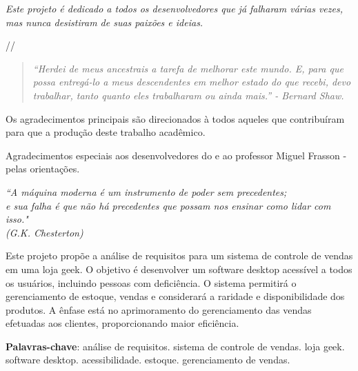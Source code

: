 \documentclass[
	12pt,				%
	openright,			%
	twoside,			%
	a4paper,			%
	english,			%
	brazil				%
	]{abntex2}
\begin{document}
\begin{dedicatoria}
	\vspace*{\fill}
	\centering
	\noindent
	\textit{Este projeto é dedicado a todos os desenvolvedores que já falharam várias vezes, mas nunca desistiram de suas paixões e ideias.}
 
	//
 
	\begin{quote}
	 \textit{``Herdei de meus ancestrais a tarefa de melhorar este mundo. E, para que possa entregá-lo a meus descendentes em melhor estado do que recebi, devo trabalhar, tanto quanto eles trabalharam ou ainda mais.'' - Bernard Shaw.}
	\end{quote}
 
	\vspace*{\fill}
 
 \end{dedicatoria}
 

\begin{agradecimentos}
	Os agradecimentos principais são direcionados à todos aqueles que contribuíram para que a produção deste trabalho acadêmico.

	Agradecimentos especiais aos desenvolvedores do \abnTeX e ao professor Miguel Frasson - pelas orientações.

\end{agradecimentos}

\begin{epigrafe}
	\vspace*{\fill}
	\begin{flushright}
		\textit{``A máquina moderna é um instrumento de poder sem precedentes;\\ e sua falha é que não há precedentes que possam nos ensinar como lidar com isso." \\
		(G.K. Chesterton)}
	\end{flushright}
\end{epigrafe}



\setlength{\absparsep}{18pt} %
\begin{resumo}
	Este projeto propõe a análise de requisitos para um sistema de controle de vendas em uma loja geek. O objetivo é desenvolver um software desktop acessível a todos os usuários, incluindo pessoas com deficiência. O sistema permitirá o gerenciamento de estoque, vendas e considerará a raridade e disponibilidade dos produtos. A ênfase está no aprimoramento do gerenciamento das vendas efetuadas aos clientes, proporcionando maior eficiência.

 \textbf{Palavras-chave}: análise de requisitos. sistema de controle de vendas. loja geek. software desktop. acessibilidade. estoque. gerenciamento de vendas.
\end{resumo}
\end{document}
